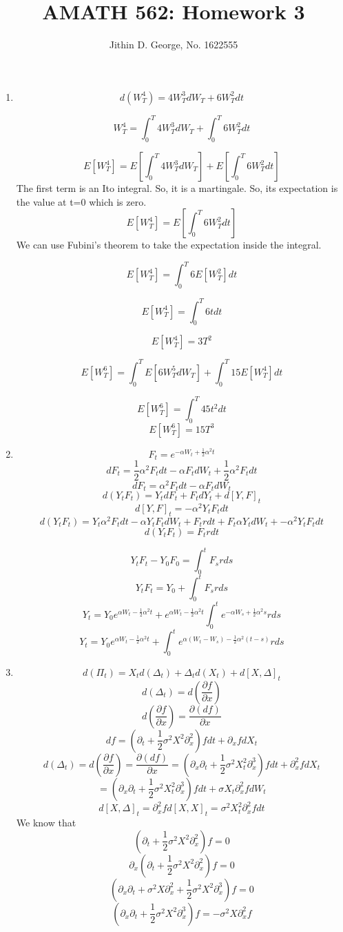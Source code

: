 \documentclass[a4paper,11pt]{article}
\title{AMATH 562: Homework 3}
\author{Jithin D. George, No. 1622555}
\begin{document}
\maketitle
\begin{enumerate}

\item 

\[d(W_T^4) =  4W_T^3 dW_T + 6W_T^2 dt\]

\[W_T^4 = \int_0^T 4W_T^3 dW_T + \int_0^T 6W_T^2 dt\]

\[E[W_T^4] = E[\int_0^T 4W_T^3 dW_T ]+ E[\int_0^T 6W_T^2 dt]\]
The first term is an Ito integral. So, it is a martingale. So, its expectation is the value at t=0 which is zero.
\[E[W_T^4] = E[\int_0^T 6W_T^2 dt]\]
We can use Fubini's theorem to take the expectation inside the integral.

\[E[W_T^4] = \int_0^T 6 E[W_T^2] dt\]

\[E[W_T^4] =  \int_0^T 6 t dt\]

\[E[W_T^4] =   3 T^2\]

\[E[W_T^6] = \int_0^T E[6W_T^5 dW_T ]+ \int_0^T 15 E[W_T^4] dt\]

\[E[W_T^6] = \int_0^T 45 t^2 dt\]
\[E[W_T^6] = 15 T^3 \]
\item
\[F_t = e^{-\alpha W_t + \frac{1}{2}\alpha^2t}\]
\[dF_t = \frac{1}{2}\alpha^2F_tdt-\alpha F_t dW_t+ \frac{1}{2}\alpha^2F_tdt\]
\[dF_t = \alpha^2F_tdt-\alpha F_t dW_t\]
\[d(Y_tF_t) = Y_t dF_t + F_tdY_t +d[Y,F]_t\]
\[ d[Y,F]_t = -\alpha^2Y_tF_tdt\]
\[d(Y_tF_t)= Y_t \alpha^2F_tdt-\alpha Y_t F_t dW_t +F_trdt +F_t\alpha Y_t dW_t+ -\alpha^2Y_tF_tdt\]
\[d(Y_tF_t)= F_trdt \]

\[Y_tF_t - Y_0F_0 = \int_0^t F_srds\]
\[Y_tF_t  =Y_0 + \int_0^t F_srds\]
\[Y_t  =Y_0e^{\alpha W_t - \frac{1}{2}\alpha^2t} + e^{\alpha W_t - \frac{1}{2}\alpha^2t}\int_0^t e^{-\alpha W_s + \frac{1}{2}\alpha^2s}rds\]
\[Y_t  =Y_0e^{\alpha W_t - \frac{1}{2}\alpha^2t} + \int_0^t e^{\alpha (W_t-W_s) - \frac{1}{2}\alpha^2(t-s)}rds\]
\item
\[d(\Pi_t) = X_td(\Delta_t) + \Delta_t d(X_t) + d[X,\Delta]_t\]
\[d(\Delta_t) =d(\frac{\partial f}{\partial x})\]
\[d(\frac{\partial f}{\partial x})=\frac{\partial (df)}{\partial x}\]
\[df=(\partial_t +\frac{1}{2} \sigma^2 X^2 \partial_x^2)f dt +\partial_x f dX_t\]
\[d(\Delta_t)= d(\frac{\partial f}{\partial x})=\frac{\partial (df)}{\partial x}=(\partial_x\partial_t +\frac{1}{2}\sigma^2 X_t^2\partial_x^3)f dt +\partial_x^2 f dX_t\]
\[=(\partial_x\partial_t +\frac{1}{2}\sigma^2 X_t^2\partial_x^3)f dt +\sigma X_t\partial_x^2 f dW_t\]
\[d[X,\Delta]_t =  \partial_x^2 f d[X,X] _t = \sigma^2 X_t^2\partial_x^2 f dt \]
We know that
\[(\partial_t + \frac{1}{2} \sigma^2 X^2 \partial_x^2)f= 0\]
\[\partial_x(\partial_t + \frac{1}{2} \sigma^2 X^2 \partial_x^2)f= 0\]
\[(\partial_x\partial_t + \sigma^2 X \partial_x^2 + \frac{1}{2} \sigma^2 X^2 \partial_x^3)f= 0\]
\[(\partial_x\partial_t + \frac{1}{2} \sigma^2 X^2 \partial_x^3)f= - \sigma^2 X \partial_x^2 f\]


\end{enumerate}
\end{document}

